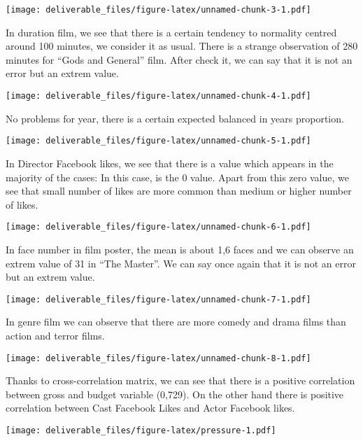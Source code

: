 \documentclass[]{article}
\begin{document}
\texttt{[image: deliverable\_files/figure-latex/unnamed-chunk-3-1.pdf]}

In duration film, we see that there is a certain tendency to normality
centred around 100 minutes, we consider it as usual. There is a strange
observation of 280 minutes for ``Gods and General'' film. After check
it, we can say that it is not an error but an extrem value.

\texttt{[image: deliverable\_files/figure-latex/unnamed-chunk-4-1.pdf]}

No problems for year, there is a certain expected balanced in years
proportion.

\texttt{[image: deliverable\_files/figure-latex/unnamed-chunk-5-1.pdf]}

In Director Facebook likes, we see that there is a value which appears
in the majority of the cases: In this case, is the 0 value. Apart from
this zero value, we see that small number of likes are more common than
medium or higher number of likes.

\texttt{[image: deliverable\_files/figure-latex/unnamed-chunk-6-1.pdf]}

In face number in film poster, the mean is about 1,6 faces and we can
observe an extrem value of 31 in ``The Master''. We can say once again
that it is not an error but an extrem value.

\texttt{[image: deliverable\_files/figure-latex/unnamed-chunk-7-1.pdf]}

In genre film we can observe that there are more comedy and drama films
than action and terror films.

\texttt{[image: deliverable\_files/figure-latex/unnamed-chunk-8-1.pdf]}

Thanks to cross-correlation matrix, we can see that there is a positive
correlation between gross and budget variable (0,729). On the other hand
there is positive correlation between Cast Facebook Likes and Actor
Facebook likes.

\texttt{[image: deliverable\_files/figure-latex/pressure-1.pdf]}
\end{document}
